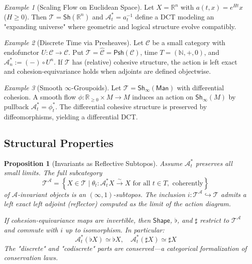 \documentclass[11pt]{article}
\theoremstyle{definition}
\theoremstyle{plain}
\newtheorem{proposition}{Proposition}
\theoremstyle{remark}
\newtheorem{example}{Example}
\begin{document}
\begin{example}[Scaling Flow on Euclidean Space]
Let $X = \mathbb{R}^n$ with $a(t,x) = e^{Ht}x$ ($H \geq 0$). Then $\mathcal{T} = \mathsf{Sh}(\mathbb{R}^n)$ and $\mathcal{A}^*_t = a^{-1}_t$ define a DCT modeling an "expanding universe" where geometric and logical structure evolve compatibly.
\end{example}

\begin{example}[Discrete Time via Presheaves]
Let $\mathcal{C}$ be a small category with endofunctor $U: \mathcal{C} \to \mathcal{C}$. Put $\mathcal{T} = \widehat{\mathcal{C}} = \mathsf{Psh}(\mathcal{C})$, time $T = (\mathbb{N}, +, 0)$, and $\mathcal{A}^*_n := (-) \circ U^n$. If $\mathcal{T}$ has (relative) cohesive structure, the action is left exact and cohesion-equivariance holds when adjoints are defined objectwise.
\end{example}

\begin{example}[Smooth $\infty$-Groupoids]
Let $\mathcal{T} = \mathsf{Sh}_\infty(\mathsf{Man})$ with differential cohesion. A smooth flow $\phi: \mathbb{R}_{\geq 0} \times M \to M$ induces an action on $\mathsf{Sh}_\infty(M)$ by pullback $\mathcal{A}^*_t = \phi^*_t$. The differential cohesive structure is preserved by diffeomorphisms, yielding a differential DCT.
\end{example}

\subsection{Structural Properties}

\begin{proposition}[Invariants as Reflective Subtopos]\label{prop:invariants}
Assume $\mathcal{A}^*_t$ preserves all small limits. The full subcategory
\[
\mathcal{T}^{\mathcal{A}} = \left\{X \in \mathcal{T} \mid \theta_t: \mathcal{A}^*_t X \xrightarrow{\sim} X \text{ for all } t \in T, \text{ coherently}\right\}
\]
of $\mathcal{A}$-invariant objects is an $(\infty,1)$-subtopos. The inclusion $i: \mathcal{T}^{\mathcal{A}} \hookrightarrow \mathcal{T}$ admits a left exact left adjoint (reflector) computed as the limit of the action diagram.

If cohesion-equivariance maps are invertible, then $\mathsf{Shape}$, $\flat$, and $\sharp$ restrict to $\mathcal{T}^{\mathcal{A}}$ and commute with $i$ up to isomorphism. In particular:
\[
\mathcal{A}^*_t(\flat X) \simeq \flat X, \quad \mathcal{A}^*_t(\sharp X) \simeq \sharp X
\]
The "discrete" and "codiscrete" parts are conserved—a categorical formalization of conservation laws.
\end{proposition}
\end{document}
